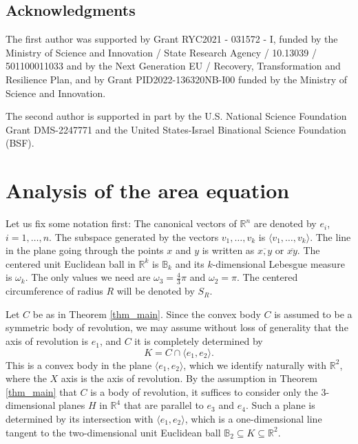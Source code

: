 \documentclass{amsart}
\def \R{\mathbb R}
\def \B{\mathbb B}
\begin{document}
\subsection*{Acknowledgments}
The first author was supported by Grant RYC2021 - 031572 - I, funded by the Ministry of Science and Innovation / State Research Agency / 10.13039 / 501100011033 and by the Next Generation EU / Recovery, Transformation and Resilience Plan, and by Grant PID2022-136320NB-I00 funded by the Ministry of Science and Innovation.

The second author is supported in part by the U.S. National Science Foundation Grant DMS-2247771 and
the United States-Israel Binational Science Foundation (BSF).

\section{Analysis of the area equation}

\label{sec_area_equation}
Let us fix some notation first:
The canonical vectors of $\R^n$ are denoted by $e_i$, $i = 1, \ldots, n$.
The subspace generated by the vectors $v_1, \ldots, v_k$ is $\langle v_1, \ldots, v_k \rangle$.
The line in the plane going through the points $x$ and $y$ is written as $\overline{x, y}$ or $\overline{xy}$.
The centered unit Euclidean ball in $\R^k$ is $\B_k$ and its $k$-dimensional Lebesgue measure is $\omega_k$.
The only values we need are $\omega_3 = \frac 43 \pi$ and $\omega_2 = \pi$.
The centered circumference of radius $R$ will be denoted by $S_R$.

Let $C$ be as in Theorem \ref{thm_main}.
Since the convex body $C$ is assumed to be a symmetric body of revolution, we may assume without loss of generality that the axis of revolution is $e_1$, and $C$ it is completely determined by 
\begin{equation}
	\label{def_K}
	K = C \cap \langle e_1, e_2 \rangle. %
\end{equation}
This is a convex body in the plane $\langle e_1, e_2 \rangle$, which we identify naturally with $\R^2$, where the $X$ axis is the axis of revolution.
By the assumption in Theorem \ref{thm_main} that $C$ is a body of revolution, it suffices to consider only the $3$-dimensional planes $H$ in $\R^4$ that are parallel to $e_3$ and $e_4$.
Such a plane is determined by its intersection with $\langle e_1, e_2 \rangle$, which is a one-dimensional line tangent to the two-dimensional unit Euclidean ball $\B_2 \subseteq K \subseteq \R^2$.
\end{document}
